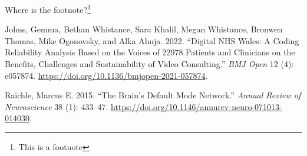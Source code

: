 \documentclass[
  letterpaper,
  DIV=11,
  numbers=noendperiod]{scrartcl}
\newlength{\cslhangindent}
\newenvironment{CSLReferences}[2] %
 {\begin{list}{}{%
  \setlength{\itemindent}{0pt}
  \setlength{\leftmargin}{0pt}
  \setlength{\parsep}{0pt}
  \ifodd #1
   \setlength{\leftmargin}{\cslhangindent}
   \setlength{\itemindent}{-1\cslhangindent}
  \fi
  \setlength{\itemsep}{#2\baselineskip}}}
 {\end{list}}
\begin{document}
Where is the footnote?\footnote{This is a footnote}

\label{refs}
\begin{CSLReferences}{1}{0}
Johns, Gemma, Bethan Whistance, Sara Khalil, Megan Whistance, Bronwen
Thomas, Mike Ogonovsky, and Alka Ahuja. 2022. {``Digital NHS Wales: A
Coding Reliability Analysis Based on the Voices of
22{\hspace{0.167em}}978 Patients and Clinicians on the Benefits,
Challenges and Sustainability of Video Consulting.''} \emph{BMJ Open} 12
(4): e057874. \url{https://doi.org/10.1136/bmjopen-2021-057874}.

Raichle, Marcus E. 2015. {``The Brain's Default Mode Network.''}
\emph{Annual Review of Neuroscience} 38 (1): 433--47.
\url{https://doi.org/10.1146/annurev-neuro-071013-014030}.

\end{CSLReferences}
\end{document}
